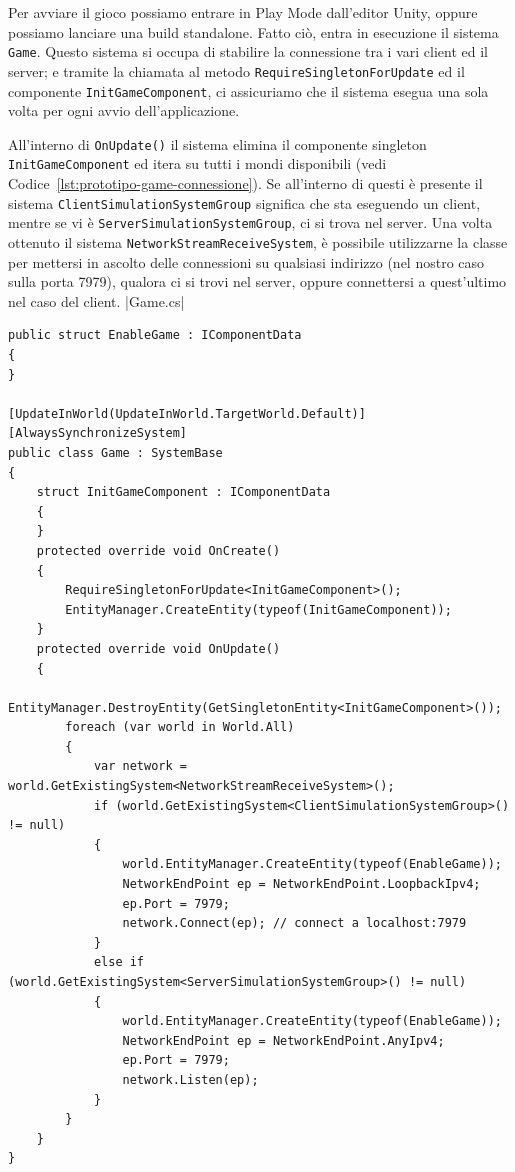 Per avviare il gioco possiamo entrare in Play Mode dall'editor Unity, oppure possiamo lanciare una build standalone. Fatto ciò, entra in esecuzione il sistema \verb|Game|. Questo sistema si occupa di stabilire la connessione tra i vari client ed il server; e tramite la chiamata al metodo \verb|RequireSingletonForUpdate| ed il componente \verb|InitGameComponent|, ci assicuriamo che il sistema esegua una sola volta per ogni avvio dell'applicazione.

All'interno di \verb|OnUpdate()| il sistema elimina il componente singleton \verb|InitGameComponent| ed itera su tutti i mondi disponibili (vedi Codice~\ref{lst:prototipo-game-connessione}). Se all'interno di questi è presente il sistema \verb|ClientSimulationSystemGroup| significa che sta eseguendo un client, mentre se vi è \verb|ServerSimulationSystemGroup|, ci si trova nel server. Una volta ottenuto il sistema \verb|NetworkStreamReceiveSystem|, è possibile utilizzarne la classe per mettersi in ascolto delle connessioni su qualsiasi indirizzo (nel nostro caso sulla porta 7979), qualora ci si trovi nel server, oppure connettersi a quest'ultimo nel caso del client.
|Game.cs|

\begin{lstlisting}[caption={File \UseVerb{GameTerm}: stabilimento della connessione.}, label={lst:prototipo-game-connessione}, language={[Sharp]C}]
public struct EnableGame : IComponentData
{
}

[UpdateInWorld(UpdateInWorld.TargetWorld.Default)]
[AlwaysSynchronizeSystem]
public class Game : SystemBase
{
    struct InitGameComponent : IComponentData
    {
    }
    protected override void OnCreate()
    {
        RequireSingletonForUpdate<InitGameComponent>();
        EntityManager.CreateEntity(typeof(InitGameComponent));
    }
    protected override void OnUpdate()
    {
        EntityManager.DestroyEntity(GetSingletonEntity<InitGameComponent>());
        foreach (var world in World.All)
        {
            var network = world.GetExistingSystem<NetworkStreamReceiveSystem>();
            if (world.GetExistingSystem<ClientSimulationSystemGroup>() != null)
            {
                world.EntityManager.CreateEntity(typeof(EnableGame));
                NetworkEndPoint ep = NetworkEndPoint.LoopbackIpv4;
                ep.Port = 7979;
                network.Connect(ep); // connect a localhost:7979
            }
            else if (world.GetExistingSystem<ServerSimulationSystemGroup>() != null)
            {
                world.EntityManager.CreateEntity(typeof(EnableGame));
                NetworkEndPoint ep = NetworkEndPoint.AnyIpv4;
                ep.Port = 7979;
                network.Listen(ep);
            }
        }
    }
}
\end{lstlisting}

